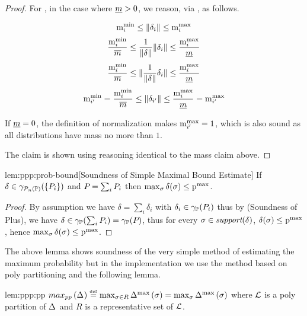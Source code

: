 \begin{proof}
For , in the case where $ \underline{m} > 0 $, we reason, via , as follows.

$$ \mathrm{m}^\mathrm{min}_{i} \leq \mathord{\parallel}\delta_i\mathord{\parallel} \leq \mathrm{m}^\mathrm{max}_{i} $$
$$ \frac{\mathrm{m}^\mathrm{min}_{i}}{\overline{m}} \leq \frac{1}{\mathord{\parallel}\delta\mathord{\parallel}} \mathord{\parallel}\delta_i\mathord{\parallel} \leq \frac{\mathrm{m}^\mathrm{max}_{i}}{\underline{m}} $$
$$ \frac{\mathrm{m}^\mathrm{min}_{i}}{\overline{m}} \leq \mathord{\parallel}\frac{1}{\mathord{\parallel}\delta\mathord{\parallel}} \delta_i\mathord{\parallel} \leq \frac{\mathrm{m}^\mathrm{max}_{i}}{\underline{m}} $$
$$ \mathrm{m}^\mathrm{min}_{i'}
= \frac{\mathrm{m}^\mathrm{min}_{i}}{\overline{m}} \leq \mathord{\parallel}\delta_{i'}\mathord{\parallel} \leq \frac{\mathrm{m}^\mathrm{max}_{i}}{\underline{m}}
= \mathrm{m}^\mathrm{max}_{i'}$$

If $ \underline{m} = 0 $, the definition of normalization makes $ \mathrm{m}^\mathrm{max}_{i'}
= 1 $, which is also sound as all distributions have mass no more than
$ 1 $.

The  claim is shown using reasoning
identical to the mass claim above.
\end{proof}

\begin{replemma}{lem:ppp:prob-bound}[Soundness of Simple Maximal Bound Estimate]
If $ \delta \in \gamma_{\mathcal{P}_{n}\left( \mathbb{P} \right)}(\left\{ P_{i} \right\}) $ and $ P_{} = \sum_i P_{i}
$ then $ \max_{\sigma} \delta(\sigma) \leq \mathrm{p}^\mathrm{max}_{} $.
\end{replemma}
\begin{proof} By assumption we have $ \delta = \sum_i \delta_i $ with
$ \delta_i \in \gamma_{\mathbb{P}}(P_{i}) $ thus by  (Soundness
of Plus), we have $ \delta \in \gamma_{\mathbb{P}}(\sum_i P_{i}) = \gamma_{\mathbb{P}}(P_{})
$, thus for every $ \sigma \in \textit{support}(\delta) $, $ \delta(\sigma) \leq
\mathrm{p}^\mathrm{max}_{} $, hence $ \max_{\sigma} \delta(\sigma) \leq \mathrm{p}^\mathrm{max}_{} $.
\end{proof}


The above lemma shows soundness of the very simple method of
estimating the maximum probability but in the implementation we use
the method based on poly partitioning and the following lemma.

\begin{replemma}{lem:ppp:pp} $ max_{pp}\left( \Delta_{} \right) \stackrel{\smash{\scriptscriptstyle \mathrm{def}}}= \max_{\sigma \in
R}\Delta_{}^{\text{max}}\left( \sigma \right) = \max_{\sigma}\Delta_{}^{\text{max}}\left( \sigma \right) $
where $ \mathcal{L} $ is a poly partition of $ \Delta_{} $ and $ R $ is a
representative set of $ \mathcal{L} $.
\end{replemma}

